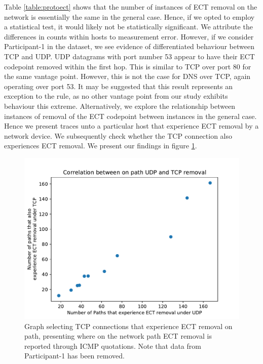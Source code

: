 \documentclass{l4proj}
\begin{document}
Table \ref{table:protoect} shows that the number of instances of ECT removal on the network is essentially the same in the general case. Hence, if we opted to employ a statistical test, it would likely not be statistically significant. We attribute the differences in counts within hosts to measurement error. However, if we consider Participant-1 in the dataset, we see evidence of differentiated behaviour between TCP and UDP. UDP datagrams with port number 53 appear to have their ECT codepoint removed within the first hop. This is similar to TCP over port 80 for the same vantage point. However, this is not the case for DNS over TCP, again operating over port 53. It may be suggested that this result represents an exception to the rule, as no other vantage point from our study exhibits behaviour this extreme. Alternatively, we explore the relationship between instances of removal of the ECT codepoint between instances in the general case. Hence we present traces unto a particular host that experience ECT removal by a network device. We subsequently check whether the TCP connection also experiences ECT removal. We present our findings in figure \ref{fig:tcpremove}.

\begin{figure}[H]
    \centering
    \includegraphics[scale=0.70]{dissertation/images/tcpudp.pdf}
    \caption{Graph selecting TCP connections that experience ECT removal on path, presenting where on the network path ECT removal is reported through ICMP quotations. Note that data from Participant-1 has been removed.}
    \label{fig:tcpremove}
\end{figure}
\end{document}
